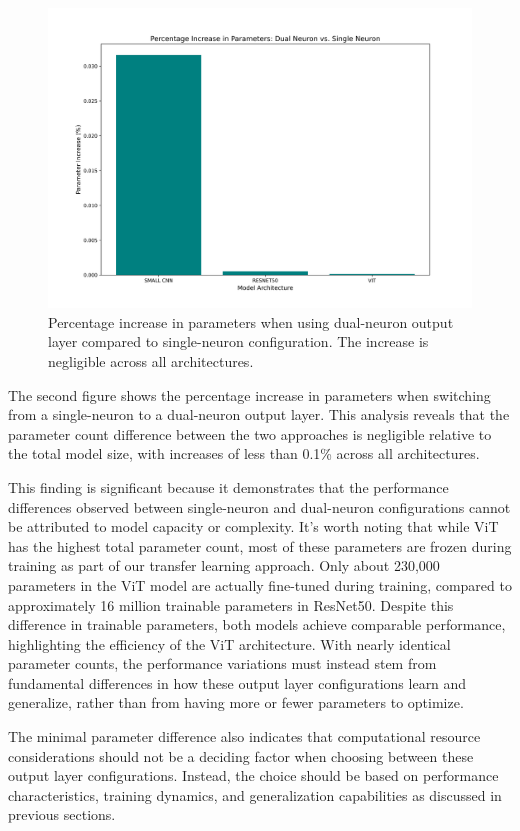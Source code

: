 \begin{figure}[htbp]
\centering
\includegraphics[width=\textwidth]{figures/parameter_increase_percentage.png}
\caption{Percentage increase in parameters when using dual-neuron output layer compared to single-neuron configuration. The increase is negligible across all architectures.}
\end{figure}

The second figure shows the percentage increase in parameters when switching from a single-neuron to a dual-neuron output layer. This analysis reveals that the parameter count difference between the two approaches is negligible relative to the total model size, with increases of less than 0.1\% across all architectures.

This finding is significant because it demonstrates that the performance differences observed between single-neuron and dual-neuron configurations cannot be attributed to model capacity or complexity. It's worth noting that while ViT has the highest total parameter count, most of these parameters are frozen during training as part of our transfer learning approach. Only about 230,000 parameters in the ViT model are actually fine-tuned during training, compared to approximately 16 million trainable parameters in ResNet50. Despite this difference in trainable parameters, both models achieve comparable performance, highlighting the efficiency of the ViT architecture. With nearly identical parameter counts, the performance variations must instead stem from fundamental differences in how these output layer configurations learn and generalize, rather than from having more or fewer parameters to optimize.

The minimal parameter difference also indicates that computational resource considerations should not be a deciding factor when choosing between these output layer configurations. Instead, the choice should be based on performance characteristics, training dynamics, and generalization capabilities as discussed in previous sections.
